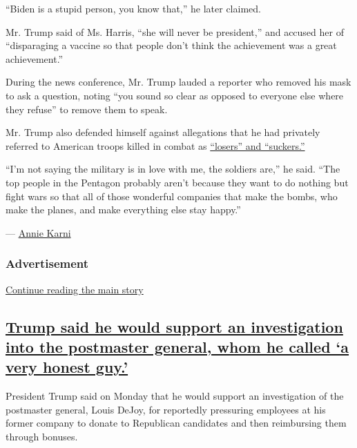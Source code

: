 ``Biden is a stupid person, you know that,'' he later claimed.

Mr. Trump said of Ms. Harris, ``she will never be president,'' and
accused her of ``disparaging a vaccine so that people don't think the
achievement was a great achievement.''

During the news conference, Mr. Trump lauded a reporter who removed his
mask to ask a question, noting ``you sound so clear as opposed to
everyone else where they refuse'' to remove them to speak.

Mr. Trump also defended himself against allegations that he had
privately referred to American troops killed in combat as
\href{https://www.nytimes3xbfgragh.onion/2020/09/04/us/politics/trump-veterans-losers.html}{``losers''
and ``suckers.''}

``I'm not saying the military is in love with me, the soldiers are,'' he
said. ``The top people in the Pentagon probably aren't because they want
to do nothing but fight wars so that all of those wonderful companies
that make the bombs, who make the planes, and make everything else stay
happy.''

--- \href{https://www.nytimes3xbfgragh.onion/by/annie-karni}{Annie
Karni}

\hypertarget{advertisement}{%
\subsubsection{Advertisement}\label{advertisement}}

\protect\hyperlink{after-dfp-ad-mid1}{Continue reading the main story}

\hypertarget{trump-said-he-would-support-an-investigation-into-the-postmaster-general-whom-he-called-a-very-honest-guy}{%
\subsection{\texorpdfstring{\protect\hyperlink{trump-said-he-would-support-an-investigation-into-the-postmaster-general-whom-he-called-a-very-honest-guy}{Trump
said he would support an investigation into the postmaster general, whom
he called `a very honest
guy.'}}{Trump said he would support an investigation into the postmaster general, whom he called `a very honest guy.'}}\label{trump-said-he-would-support-an-investigation-into-the-postmaster-general-whom-he-called-a-very-honest-guy}}

President Trump said on Monday that he would support an investigation of
the postmaster general, Louis DeJoy, for reportedly pressuring employees
at his former company to donate to Republican candidates and then
reimbursing them through bonuses.

